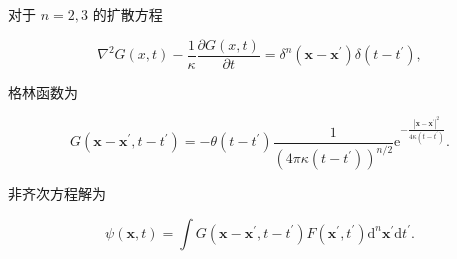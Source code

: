对于 $n=2, 3$ 的扩散方程

$$
\nabla^{2} G(x, t)-\frac{1}{\kappa} \frac{\partial G(x, t)}{\partial t} = \delta^{n}\left(\mathbf{x}-\mathbf{x}^{\prime}\right) \delta(t-t^{\prime}),
$$

格林函数为

$$
G(\mathbf{x}-\mathbf{x}^{\prime}, t-t^{\prime}) = -\theta(t-t^{\prime}) \frac{1}{(4 \pi \kappa (t-t^{\prime}))^{n/2}} \mathrm{e}^{-\frac{|\mathbf{x}-\mathbf{x}^{\prime}|^{2}}{4 \kappa (t-t^{\prime})}}.
$$

非齐次方程解为

$$
\psi(\mathbf{x}, t) = \int G(\mathbf{x}-\mathbf{x}^{\prime}, t-t^{\prime}) F(\mathbf{x}^{\prime}, t^{\prime}) \mathrm{d}^{n} \mathbf{x}^{\prime} \mathrm{d} t^{\prime}.
$$